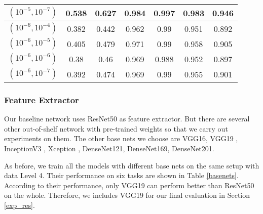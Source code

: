 \begin{table}[]
{\begin{tabular}{|c|c|c|c|c|c|c|}
			$(10^{-5}, 10^{-7})$ & 0.538 & 0.627 & 0.984 & \textbf{0.997} & 0.983 & 0.946 \\ \hline
			$(10^{-6}, 10^{-4})$ & 0.382 & 0.442 & 0.962 & 0.99 & 0.951 & 0.892 \\ \hline
			$(10^{-6}, 10^{-5})$ & 0.405 & 0.479 & 0.971 & 0.99 & 0.958 & 0.905 \\ \hline
			$(10^{-6}, 10^{-6})$ & 0.38 & 0.46 & 0.969 & 0.988 & 0.952 & 0.897 \\ \hline
			$(10^{-6}, 10^{-7})$ & 0.392 & 0.474 & 0.969 & 0.99 & 0.955 & 0.901 \\ \hline
		\end{tabular}%
	}
\end{table}

\subsubsection{Feature Extractor}
Our baseline network uses ResNet50 as feature extractor. But there are several other out-of-shelf network with pre-trained weights so that we carry out experiments on them. The other base nets we choose are VGG16, VGG19 \cite{DBLP:SimonyanZ14a}, InceptionV3 \cite{DBLP:journals/corr/SzegedyVISW15}, Xception \cite{DBLP:journals/corr/Chollet16a}, DenseNet121, DenseNet169, DenseNet201\cite{DBLP:journals/corr/HuangLW16a}.

As before, we train all the models with different base nets on the same setup with data Level 4. Their performance on six tasks are shown in Table \ref{basenets}. According to their performance, only VGG19 can perform better than ResNet50 on the whole. Therefore, we includes VGG19 for our final evaluation in Section \ref{exp_res}.

